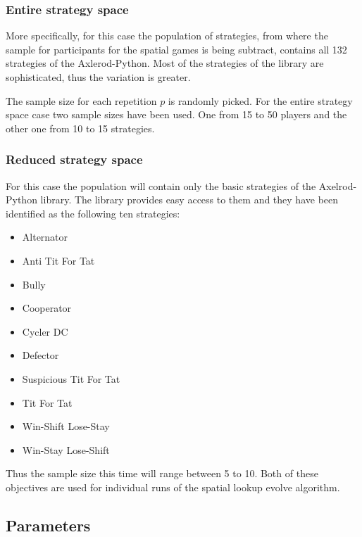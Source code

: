 \subsubsection{Entire strategy space}

More specifically, for this case
the population of strategies, from where the sample for participants for
the spatial games is being subtract, contains all 132 strategies of the
Axlerod-Python. Most of the strategies of the library are sophisticated, thus
the variation is greater.

The sample size for each repetition \(p\) is randomly picked. For the
entire strategy space case two sample sizes have been used. One from
15 to 50 players and the other one from 10 to 15 strategies.

\subsubsection{Reduced strategy space}

For this case the population will contain only
the basic strategies of the Axelrod-Python library. The library provides
easy access to them and they have been identified as the following ten strategies:
\begin{itemize}
   \item Alternator
   \item Anti Tit For Tat
   \item Bully
   \item Cooperator
   \item Cycler DC
   \item Defector
   \item Suspicious Tit For Tat
   \item Tit For Tat
   \item Win-Shift Lose-Stay
   \item Win-Stay Lose-Shift
\end{itemize}

Thus the sample size this time will range between 5 to 10. Both of these
objectives are used for individual runs of the spatial lookup evolve algorithm.

\subsection{Parameters}

